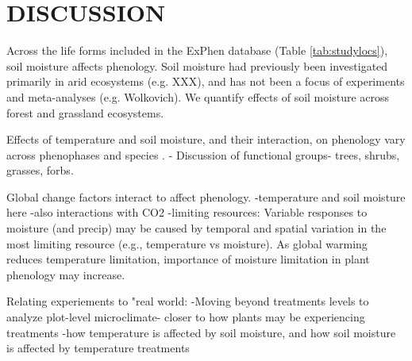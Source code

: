 \documentclass{article}
\begin{document}
\section* {DISCUSSION}
\par  Across the life forms included in the ExPhen database (Table \ref{tab:studylocs}), soil moisture affects phenology. Soil moisture had previously been investigated primarily in arid ecosystems (e.g. XXX), and has not been a focus of experiments and meta-analyses (e.g. Wolkovich). We quantify effects of soil moisture across forest and grassland ecosystems.

\par Effects of temperature and soil moisture, and their interaction, on phenology vary across phenophases and species .
- Discussion of functional groups- trees, shrubs, grasses, forbs.

 \par Global change factors interact to affect phenology.  
 -temperature and soil moisture here
 -also interactions with CO2
 -limiting resources: Variable responses to moisture (and precip) may be caused by temporal and spatial variation in the most limiting resource (e.g., temperature vs moisture). As global warming reduces temperature limitation, importance of moisture limitation in plant phenology may increase. 

\par Relating experiements to "real world:
    -Moving beyond treatments levels to analyze plot-level microclimate- closer to how plants may be experiencing treatments
    -how temperature is affected by soil moisture, and how soil moisture is affected by temperature treatments
\end{document}
